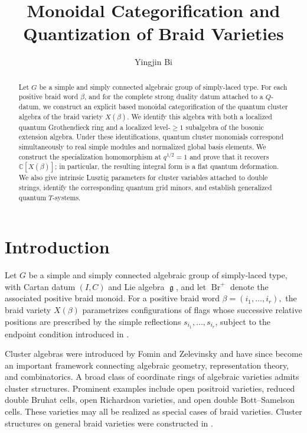 \documentclass[12pt, reqno]{amsart}
\theoremstyle{plain}
\theoremstyle{definition}
\numberwithin{equation}{section}
\newcommand{\CC}{\mathbb{C}}
\newcommand{\fg}{\operatorname{\mathfrak{g}}}
\newcommand{\Br}{{\operatorname{Br}}}
\begin{document}
\title{Monoidal Categorification and Quantization of Braid Varieties}
\author{Yingjin Bi}
\address{Department of Mathematics, Harbin Engineering University}
\address{Research Institute for Mathematical Sciences,
Kyoto University, 
Kyoto, Japan}
\date{} 

\begin{abstract}
Let \(G\) be a simple and simply connected algebraic group of
simply-laced type. For each positive braid word \(\beta\), and for the
complete strong duality datum attached to a
\(Q\)-datum, we construct an explicit based monoidal categorification of
the quantum cluster algebra of the braid variety \(X(\beta)\). We
identify this algebra with both a localized quantum Grothendieck ring
and a localized level-\(\geq1\) subalgebra of the bosonic extension
algebra. Under these identifications, quantum cluster monomials
correspond simultaneously to real simple modules and normalized global
basis elements. We construct the specialization homomorphism at
\(q^{1/2}=1\) and prove that it recovers \(\CC[X(\beta)]\); in
particular, the resulting integral form is a flat quantum deformation.
We also give intrinsic Lusztig parameters for cluster
variables attached to double strings, identify the corresponding
quantum grid minors, and establish generalized quantum \(T\)-systems.
\end{abstract}


\maketitle 

\tableofcontents

\section{Introduction}
Let \(G\) be a simple and simply connected algebraic group of
simply-laced type, with Cartan datum \((I,C)\) and Lie algebra
\(\fg\), and let \(\Br^+\) denote the associated positive braid
monoid. For a positive braid word
\(
    \beta=(i_1,\ldots,i_r),
\)
the braid variety \(X(\beta)\) parametrizes configurations of flags
whose successive relative positions are prescribed by the simple
reflections \(s_{i_1},\ldots,s_{i_r}\), subject to the endpoint
condition introduced in \cite[Section~3]{casals2025cluster}.

Cluster algebras were introduced by Fomin and Zelevinsky
\cite{fomin2002cluster} and have since become an important framework
connecting algebraic geometry, representation theory, and
combinatorics. A broad class of coordinate rings of algebraic
varieties admits cluster structures. Prominent examples include open
positroid varieties, reduced double Bruhat cells, open Richardson
varieties, and open double Bott--Samelson cells. These varieties may
all be realized as special cases of braid varieties. Cluster
structures on general braid varieties were constructed in
\cite{casals2025cluster,galashin2026braidII}.
\end{document}
